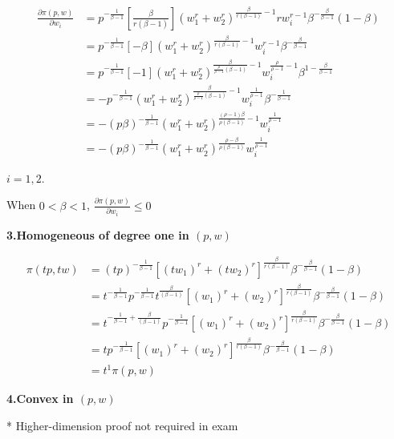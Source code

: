 \documentclass{article}
\begin{document}
\begin{align*}
\frac{\partial \pi(p, w)}{\partial w_i} &= 
p^{-\frac{1}{\beta - 1}} [\frac{\beta}{r(\beta - 1)}](w_1^r + w_2^r)^{\frac{\beta}{r(\beta - 1)} -1} r w_i^{r-1}\beta^{-\frac{\beta}{\beta - 1}}(1-\beta) \\
&= p^{-\frac{1}{\beta - 1}} [-\beta](w_1^r + w_2^r)^{\frac{\beta}{r(\beta - 1)} -1} w_i^{r-1}\beta^{-\frac{\beta}{\beta - 1}} \\
&= p^{-\frac{1}{\beta - 1}} [-1](w_1^r + w_2^r)^{\frac{\beta}{\frac{\rho}{\rho -1}(\beta - 1)} -1} w_i^{\frac{\rho}{\rho -1}-1}\beta^{1-\frac{\beta}{\beta - 1}} \\
&= -p^{-\frac{1}{\beta - 1}}(w_1^r + w_2^r)^{\frac{\beta}{\frac{\rho}{\rho -1}(\beta - 1)} -1} w_i^{\frac{1}{\rho -1}}\beta^{-\frac{1}{\beta - 1}} \\
&= -(p\beta)^{-\frac{1}{\beta - 1}}(w_1^r + w_2^r)^{\frac{(\rho -1)\beta}{\rho(\beta - 1)} -1} w_i^{\frac{1}{\rho -1}}\\
&= -(p\beta)^{-\frac{1}{\beta - 1}}(w_1^r + w_2^r)^{\frac{\rho -\beta}{\rho(\beta-1)} }w_i^{\frac{1}{\rho -1}}
\end{align*}

$i = 1,2$.

When $0<\beta <1$, $\frac{\partial \pi(p, w)}{\partial w_i} \le 0 $

\vspace{3mm}
\textbf{3.Homogeneous of degree one in $(p,w)$}

\begin{align*}
\pi(tp,tw) &= (tp)^{-\frac{1}{\beta - 1}} [(tw_1)^r + (tw_2)^r]^{\frac{\beta}{r(\beta - 1)}}\beta^{-\frac{\beta}{\beta - 1}}(1-\beta) \\
&= t^{-\frac{1}{\beta - 1}}p^{-\frac{1}{\beta - 1}} t^{\frac{\beta}{(\beta - 1)}} [(w_1)^r + (w_2)^r]^{\frac{\beta}{r(\beta - 1)}}\beta^{-\frac{\beta}{\beta - 1}}(1-\beta) \\
&= t^{-\frac{1}{\beta - 1} + \frac{\beta}{(\beta - 1)}}p^{-\frac{1}{\beta - 1}} [(w_1)^r + (w_2)^r]^{\frac{\beta}{r(\beta - 1)}}\beta^{-\frac{\beta}{\beta - 1}}(1-\beta) \\
&= tp^{-\frac{1}{\beta - 1}} [(w_1)^r + (w_2)^r]^{\frac{\beta}{r(\beta - 1)}}\beta^{-\frac{\beta}{\beta - 1}}(1-\beta) \\
&= t^1\pi(p,w) 
\end{align*}

\vspace{3mm}
\textbf{4.Convex in $(p,w)$}

* Higher-dimension proof not required in exam
\end{document}
